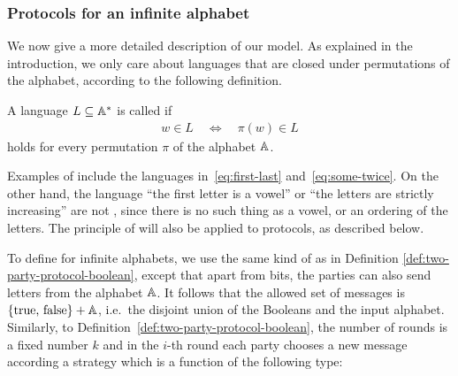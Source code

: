 


\subsubsection{Protocols for an infinite alphabet}
\label{sec:protocols-infinite-alphabet}
\AP
We now give a more detailed description of our model. 
As explained in the introduction, we only care about languages that are closed 
under permutations of the alphabet, according to the following definition. 

\begin{definition} \label{def:equivariant-language}
  \AP
  A language $L \subseteq \mathbb A^*$ is called  if 
  \begin{align*}
  w \in L \quad \iff \quad \pi(w) \in L
  \end{align*}
  holds for every permutation $\pi$ of the alphabet $\mathbb A$.
\end{definition}

Examples of  include the languages
in~\eqref{eq:first-last} and~\eqref{eq:some-twice}. On the other hand, the
language ``the first letter is a vowel'' or ``the letters are strictly
increasing'' are not , since there is no such thing as a vowel,
or an ordering of the letters. The principle of  will also be applied to protocols, as described below.


\AP To define  for infinite alphabets, we use the
same kind of  as in Definition \ref{def:two-party-protocol-boolean},
except that apart from bits, the parties can also send letters from the
alphabet $\mathbb A$. It follows that the allowed set of messages is
$\{\text{true, false}\} + \mathbb A$, i.e.~the disjoint union of the Booleans
and the input alphabet. Similarly, to
Definition~\ref{def:two-party-protocol-boolean}, the number of rounds is a
fixed number $k$ and in the $i$-th round each party chooses a new message
according a strategy which is a function of the following type: 

